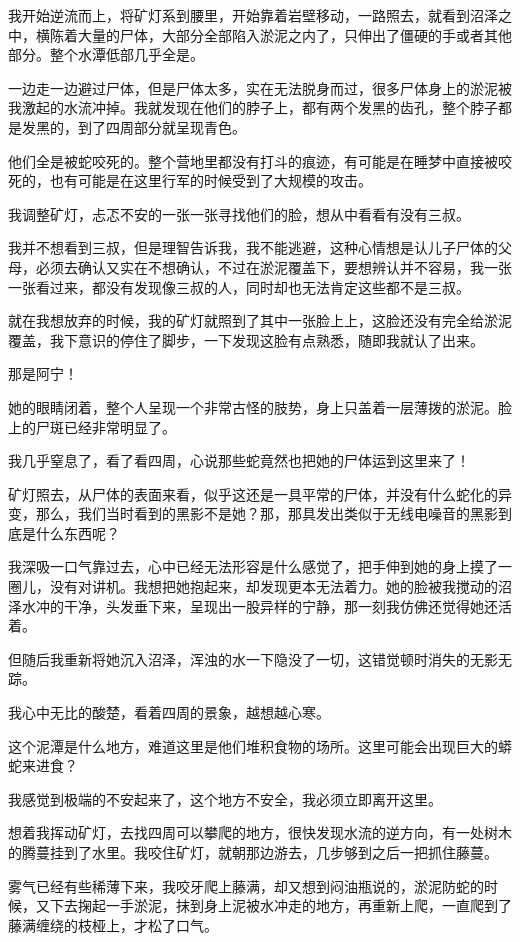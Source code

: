 我开始逆流而上，将矿灯系到腰里，开始靠着岩壁移动，一路照去，就看到沼泽之中，横陈着大量的尸体，大部分全部陷入淤泥之内了，只伸出了僵硬的手或者其他部分。整个水潭低部几乎全是。

一边走一边避过尸体，但是尸体太多，实在无法脱身而过，很多尸体身上的淤泥被我激起的水流冲掉。我就发现在他们的脖子上，都有两个发黑的齿孔，整个脖子都是发黑的，到了四周部分就呈现青色。

他们全是被蛇咬死的。整个营地里都没有打斗的痕迹，有可能是在睡梦中直接被咬死的，也有可能是在这里行军的时候受到了大规模的攻击。

我调整矿灯，忐忑不安的一张一张寻找他们的脸，想从中看看有没有三叔。

我并不想看到三叔，但是理智告诉我，我不能逃避，这种心情想是认儿子尸体的父母，必须去确认又实在不想确认，不过在淤泥覆盖下，要想辨认并不容易，我一张一张看过来，都没有发现像三叔的人，同时却也无法肯定这些都不是三叔。

就在我想放弃的时候，我的矿灯就照到了其中一张脸上上，这脸还没有完全给淤泥覆盖，我下意识的停住了脚步，一下发现这脸有点熟悉，随即我就认了出来。

那是阿宁！

她的眼睛闭着，整个人呈现一个非常古怪的肢势，身上只盖着一层薄拨的淤泥。脸上的尸斑已经非常明显了。

我几乎窒息了，看了看四周，心说那些蛇竟然也把她的尸体运到这里来了！

矿灯照去，从尸体的表面来看，似乎这还是一具平常的尸体，并没有什么蛇化的异变，那么，我们当时看到的黑影不是她？那，那具发出类似于无线电噪音的黑影到底是什么东西呢？

我深吸一口气靠过去，心中已经无法形容是什么感觉了，把手伸到她的身上摸了一圈儿，没有对讲机。我想把她抱起来，却发现更本无法着力。她的脸被我搅动的沼泽水冲的干净，头发垂下来，呈现出一股异样的宁静，那一刻我仿佛还觉得她还活着。

但随后我重新将她沉入沼泽，浑浊的水一下隐没了一切，这错觉顿时消失的无影无踪。

我心中无比的酸楚，看着四周的景象，越想越心寒。

这个泥潭是什么地方，难道这里是他们堆积食物的场所。这里可能会出现巨大的蟒蛇来进食？

我感觉到极端的不安起来了，这个地方不安全，我必须立即离开这里。

想着我挥动矿灯，去找四周可以攀爬的地方，很快发现水流的逆方向，有一处树木的腾蔓挂到了水里。我咬住矿灯，就朝那边游去，几步够到之后一把抓住藤蔓。

雾气已经有些稀薄下来，我咬牙爬上藤满，却又想到闷油瓶说的，淤泥防蛇的时候，又下去掬起一手淤泥，抹到身上泥被水冲走的地方，再重新上爬，一直爬到了藤满缠绕的枝桠上，才松了口气。

